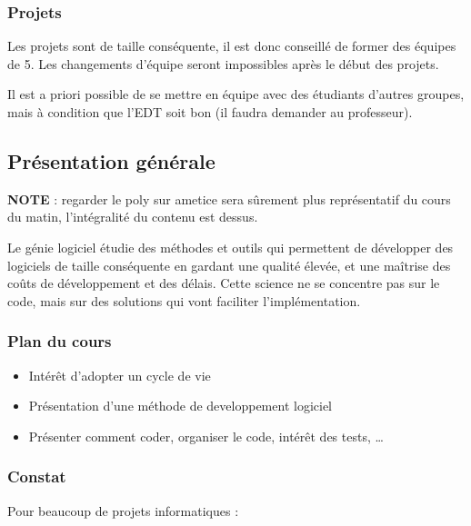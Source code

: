 \hypertarget{projets}{%
\subsubsection{Projets}\label{projets}}

Les projets sont de taille conséquente, il est donc conseillé de former
des équipes de 5. Les changements d'équipe seront impossibles après le
début des projets.

Il est a priori possible de se mettre en équipe avec des étudiants
d'autres groupes, mais à condition que l'EDT soit bon (il faudra
demander au professeur).

\hypertarget{pruxe9sentation-guxe9nuxe9rale}{%
\subsection{Présentation
générale}\label{pruxe9sentation-guxe9nuxe9rale}}

\textbf{NOTE} : regarder le poly sur ametice sera sûrement plus
représentatif du cours du matin, l'intégralité du contenu est dessus.

Le génie logiciel étudie des méthodes et outils qui permettent de
développer des logiciels de taille conséquente en gardant une qualité
élevée, et une maîtrise des coûts de développement et des délais. Cette
science ne se concentre pas sur le code, mais sur des solutions qui vont
faciliter l'implémentation.

\hypertarget{plan-du-cours}{%
\subsubsection{Plan du cours}\label{plan-du-cours}}

\begin{itemize}
\tightlist
\item
  Intérêt d'adopter un cycle de vie
\item
  Présentation d'une méthode de developpement logiciel
\item
  Présenter comment coder, organiser le code, intérêt des tests, \ldots{}
\end{itemize}

\hypertarget{constat}{%
\subsubsection{Constat}\label{constat}}

Pour beaucoup de projets informatiques :

